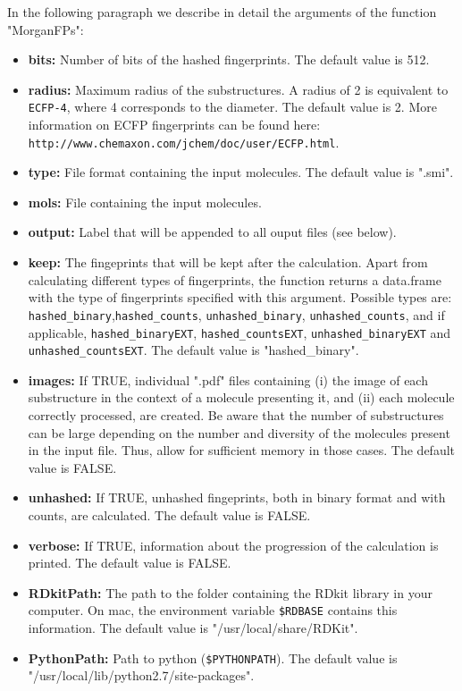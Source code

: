 \documentclass[twoside,a4wide,12pt]{article}\usepackage[]{graphicx}\usepackage[]{color}
\begin{document}
In the following paragraph we describe in detail the arguments of the function "MorganFPs":
\begin{itemize}
\item {\bf bits:} Number of bits of the hashed fingerprints. The default value is 512.
\item {\bf radius:} Maximum radius of the substructures. A radius of 2 is equivalent to \verb|ECFP-4|, where 4 corresponds to the diameter. The default value is 2.
More information on ECFP fingerprints can be found here: \verb|http://www.chemaxon.com/jchem/doc/user/ECFP.html|.
\item {\bf type:} File format containing the input molecules. The default value is ".smi".
\item {\bf mols:} File containing the input molecules.
\item {\bf output:} Label that will be appended to all ouput files (see below).
\item {\bf keep:} The fingeprints that will be kept after the calculation.
Apart from calculating different types of fingerprints, the function returns a data.frame with the type of fingerprints specified with this argument.  Possible types are: \verb|hashed_binary|,\verb|hashed_counts|, \verb|unhashed_binary|, \verb|unhashed_counts|, and if applicable, \verb|hashed_binaryEXT|, \verb|hashed_countsEXT|, \verb|unhashed_binaryEXT| and \verb|unhashed_countsEXT|.
The default value is "hashed_binary".
\item {\bf images:} If TRUE, individual ".pdf" files containing (i) the image of each substructure in the context of a molecule presenting it, and (ii) each molecule correctly processed, are created.  Be aware that the number of substructures can be large depending on the number and diversity of the molecules present in the input file. Thus, allow for sufficient memory in those cases.
The default value is FALSE.
\item {\bf unhashed:} If TRUE, unhashed fingeprints, both in binary format and with counts, are calculated. The default value is FALSE.
\item {\bf verbose:} If TRUE, information about the progression of the calculation is printed. The default value is FALSE.
\item {\bf RDkitPath:} The path to the folder containing the RDkit library in your computer. On mac, the environment variable \verb|$RDBASE| contains this information. The default value is "/usr/local/share/RDKit".
\item {\bf PythonPath:} Path to python (\verb|$PYTHONPATH|). The default value is "/usr/local/lib/python2.7/site-packages".

\end{itemize}
\end{document}

